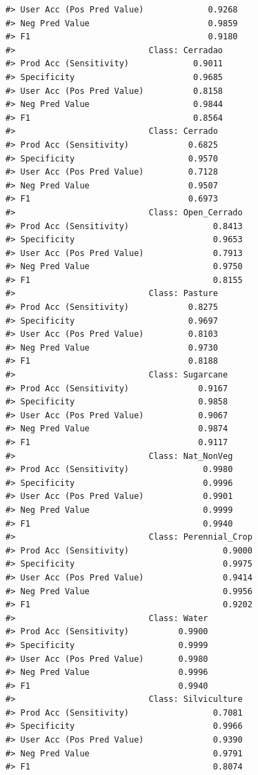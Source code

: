 \documentclass[
  11pt,
]{report}
\begin{document}
\begin{lstlisting}
#> User Acc (Pos Pred Value)             0.9268
#> Neg Pred Value                        0.9859
#> F1                                    0.9180
#>                           Class: Cerradao
#> Prod Acc (Sensitivity)             0.9011
#> Specificity                        0.9685
#> User Acc (Pos Pred Value)          0.8158
#> Neg Pred Value                     0.9844
#> F1                                 0.8564
#>                           Class: Cerrado
#> Prod Acc (Sensitivity)            0.6825
#> Specificity                       0.9570
#> User Acc (Pos Pred Value)         0.7128
#> Neg Pred Value                    0.9507
#> F1                                0.6973
#>                           Class: Open_Cerrado
#> Prod Acc (Sensitivity)                 0.8413
#> Specificity                            0.9653
#> User Acc (Pos Pred Value)              0.7913
#> Neg Pred Value                         0.9750
#> F1                                     0.8155
#>                           Class: Pasture
#> Prod Acc (Sensitivity)            0.8275
#> Specificity                       0.9697
#> User Acc (Pos Pred Value)         0.8103
#> Neg Pred Value                    0.9730
#> F1                                0.8188
#>                           Class: Sugarcane
#> Prod Acc (Sensitivity)              0.9167
#> Specificity                         0.9858
#> User Acc (Pos Pred Value)           0.9067
#> Neg Pred Value                      0.9874
#> F1                                  0.9117
#>                           Class: Nat_NonVeg
#> Prod Acc (Sensitivity)               0.9980
#> Specificity                          0.9996
#> User Acc (Pos Pred Value)            0.9901
#> Neg Pred Value                       0.9999
#> F1                                   0.9940
#>                           Class: Perennial_Crop
#> Prod Acc (Sensitivity)                   0.9000
#> Specificity                              0.9975
#> User Acc (Pos Pred Value)                0.9414
#> Neg Pred Value                           0.9956
#> F1                                       0.9202
#>                           Class: Water
#> Prod Acc (Sensitivity)          0.9900
#> Specificity                     0.9999
#> User Acc (Pos Pred Value)       0.9980
#> Neg Pred Value                  0.9996
#> F1                              0.9940
#>                           Class: Silviculture
#> Prod Acc (Sensitivity)                 0.7081
#> Specificity                            0.9966
#> User Acc (Pos Pred Value)              0.9390
#> Neg Pred Value                         0.9791
#> F1                                     0.8074
\end{lstlisting}
\end{document}
